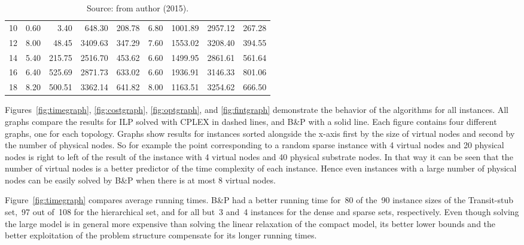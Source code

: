 \begin{table*}[h]
\begin{center}
\begin{tabular} {l | r r r r | r r r r }
10&      0.60 & 3.40 & 648.30 & 208.78 & 6.80 & 1001.89 & 2957.12 & 267.28        \\
12&      8.00 & 48.45 & 3409.63 & 347.29 & 7.60 & 1553.02 & 3208.40 & 394.55      \\
14&      5.40 & 215.75 & 2516.70 & 453.62 & 6.60 & 1499.95 & 2861.61 & 561.64     \\
16&      6.40 & 525.69 & 2871.73 & 633.02 & 6.60 & 1936.91 & 3146.33 & 801.06     \\
18&      8.20 & 500.51 & 3362.14 & 641.82 & 8.00 & 1163.51 & 3254.62 & 666.50     \\ 
\hline
\end{tabular}\caption*{Source: from author (2015).} 
\end{center}
\end{table*}

Figures~\ref{fig:timegraph}, \ref{fig:costgraph}, \ref{fig:optgraph}, and \ref{fig:fintgraph} demonstrate the behavior of the algorithms for all instances. All graphs compare the results for ILP solved with CPLEX in dashed lines, and B\&P with a solid line. 
Each figure contains four different graphs, one for each topology. 
Graphs show results for instances sorted alongside the x-axis first by the size of virtual nodes and second by the number of physical nodes. 
So for example the point corresponding to a random sparse instance with 4 virtual nodes and 20 physical nodes is right to left of the result of the instance with 4 virtual nodes and 40 physical substrate nodes. 
In that way it can be seen that the number of virtual nodes is a better predictor of the time complexity of each instance. 
Hence even instances with a large number of physical nodes can be easily solved by B\&P when there is at most 8 virtual nodes.

Figure~\ref{fig:timegraph} compares average running times. 
B\&P had a better running time for~80 of the~90 instance sizes of the Transit-stub set,~97 out of~108 for the hierarchical set, and for all but~3 and~4 instances for the dense and sparse sets, respectively.
Even though solving the large model is in general more expensive than solving the linear relaxation of the compact model, its better lower bounds and the better exploitation of the problem structure compensate for its longer running times.


